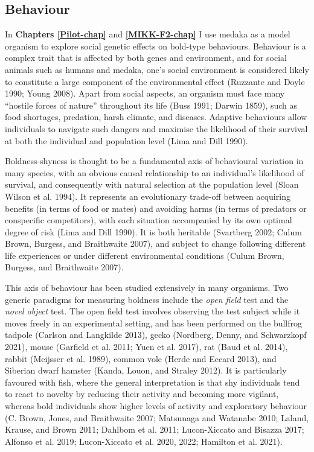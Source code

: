\documentclass[
]{book}
\begin{document}
\hypertarget{intro-behaviour}{%
\subsection{Behaviour}\label{intro-behaviour}}

In \textbf{Chapters \ref{Pilot-chap}} and \textbf{\ref{MIKK-F2-chap}} I use medaka as a model organism to explore social genetic effects on bold-type behaviours. Behaviour is a complex trait that is affected by both genes and environment, and for social animals such as humans and medaka, one's social environment is considered likely to constitute a large component of the environmental effect (Ruzzante and Doyle 1990; Young 2008). Apart from social aspects, an organism must face many ``hostile forces of nature'' throughout its life (Buss 1991; Darwin 1859), such as food shortages, predation, harsh climate, and diseases. Adaptive behaviours allow individuals to navigate such dangers and maximise the likelihood of their survival at both the individual and population level (Lima and Dill 1990).

Boldness-shyness is thought to be a fundamental axis of behavioural variation in many species, with an obvious causal relationship to an individual's likelihood of survival, and consequently with natural selection at the population level (Sloan Wilson et al. 1994). It represents an evolutionary trade-off between acquiring benefits (in terms of food or mates) and avoiding harms (in terms of predators or conspecific competitors), with each situation accompanied by its own optimal degree of risk (Lima and Dill 1990). It is both heritable (Svartberg 2002; Culum Brown, Burgess, and Braithwaite 2007), and subject to change following different life experiences or under different environmental conditions (Culum Brown, Burgess, and Braithwaite 2007).

This axis of behaviour has been studied extensively in many organisms. Two generic paradigms for measuring boldness include the \emph{open field} test and the \emph{novel object} test. The open field test involves observing the test subject while it moves freely in an experimental setting, and has been performed on the bullfrog tadpole (Carlson and Langkilde 2013), gecko (Nordberg, Denny, and Schwarzkopf 2021), mouse (Garfield et al. 2011; Yuen et al. 2017), rat (Baud et al. 2014), rabbit (Meijsser et al. 1989), common vole (Herde and Eccard 2013), and Siberian dwarf hamster (Kanda, Louon, and Straley 2012). It is particularly favoured with fish, where the general interpretation is that shy individuals tend to react to novelty by reducing their activity and becoming more vigilant, whereas bold individuals show higher levels of activity and exploratory behaviour (C. Brown, Jones, and Braithwaite 2007; Matsunaga and Watanabe 2010; Laland, Krause, and Brown 2011; Dahlbom et al. 2011; Lucon-Xiccato and Bisazza 2017; Alfonso et al. 2019; Lucon-Xiccato et al. 2020, 2022; Hamilton et al. 2021).
\end{document}
